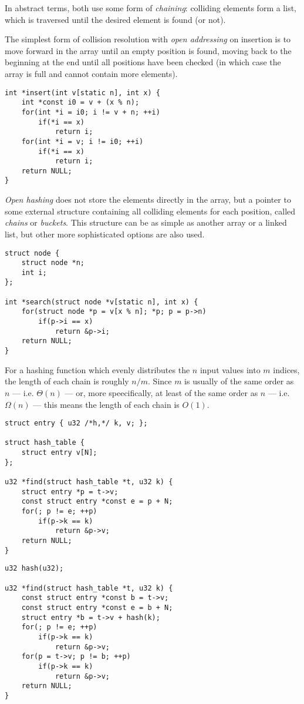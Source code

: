 In abstract terms, both use some form of \textit{chaining}: colliding elements
form a list, which is traversed until the desired element is found (or not).

The simplest form of collision resolution with \textit{open addressing} on
insertion is to move forward in the array until an empty position is found,
moving back to the beginning at the end until all positions have been checked
(in which case the array is full and cannot contain more elements).

\begin{lstlisting}[style=c]
int *insert(int v[static n], int x) {
    int *const i0 = v + (x % n);
    for(int *i = i0; i != v + n; ++i)
        if(*i == x)
            return i;
    for(int *i = v; i != i0; ++i)
        if(*i == x)
            return i;
    return NULL;
}
\end{lstlisting}

\textit{Open hashing} does not store the elements directly in the array, but a
pointer to some external structure containing all colliding elements for each
position, called \textit{chains} or \textit{buckets}.  This structure can be as
simple as another array or a linked list, but other more sophisticated options
are also used.

\begin{lstlisting}[style=c]
struct node {
    struct node *n;
    int i;
};

int *search(struct node *v[static n], int x) {
    for(struct node *p = v[x % n]; *p; p = p->n)
        if(p->i == x)
            return &p->i;
    return NULL;
}
\end{lstlisting}

For a hashing function which evenly distributes the $n$ input values into $m$
indices, the length of each chain is roughly $n/m$.  Since $m$ is usually of the
same order as $n$ --- i.e. $\Theta(n)$ --- or, more speecifically, at least of
the same order as $n$ --- i.e. $\Omega(n)$ --- this means the length of each
chain is $O(1)$.

\begin{multicols}{2}
    \begin{lstlisting}[style=c,xleftmargin=0px,xrightmargin=0px]
struct entry { u32 /*h,*/ k, v; };

struct hash_table {
    struct entry v[N];
};

u32 *find(struct hash_table *t, u32 k) {
    struct entry *p = t->v;
    const struct entry *const e = p + N;
    for(; p != e; ++p)
        if(p->k == k)
            return &p->v;
    return NULL;
}
    \end{lstlisting}
    \columnbreak
    \begin{lstlisting}[style=c,xleftmargin=0px,xrightmargin=0px]
u32 hash(u32);

u32 *find(struct hash_table *t, u32 k) {
    const struct entry *const b = t->v;
    const struct entry *const e = b + N;
    struct entry *b = t->v + hash(k);
    for(; p != e; ++p)
        if(p->k == k)
            return &p->v;
    for(p = t->v; p != b; ++p)
        if(p->k == k)
            return &p->v;
    return NULL;
}
    \end{lstlisting}
\end{multicols}

